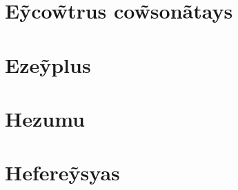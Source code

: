 \documentclass[12pt, a5paper, titlepage]{article}
\begin{document}
\begin{bilingualpages}
    \section{E\~yco\~wtrus co\~wsonãtays}

    \section{Eze\~yplus}
    
\end{bilingualpages}

\newpage
\section{Hezumu}

\newpage
\section{Hefere\~ysyas}
\end{document}
